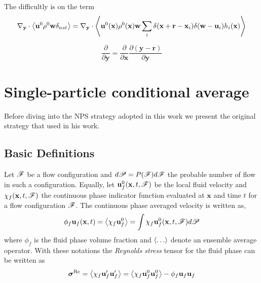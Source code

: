 The difficultly is on the term 
\begin{equation*}
    {\mathbf{\nabla}_\textbf{y}} \cdot \left<\textbf{u}^0\rho^0 \textbf{w}   \delta_{nst} \right>
    = 
    {\mathbf{\nabla}_\textbf{y}} \cdot \left<\textbf{u}^0(\textbf{x})\rho^0(\textbf{x}) \textbf{w}   \sum_i \delta(\textbf{x}+ \textbf{r} - \textbf{x}_i)\delta(\textbf{w}- \textbf{u}_i) h_i(\textbf{x}) \right>
\end{equation*}


\begin{equation*}
    \frac{\partial }{\partial \textbf{y}}
    = 
    \frac{\partial }{\partial \textbf{x}}
    \frac{\partial (\textbf{y} - \textbf{r} )}{\partial \textbf{y}}
\end{equation*}

\section{Single-particle conditional average}

Before diving into the NPS strategy adopted in this work we present the original strategy that \citet{van1982bubble} used in his work. 

\subsection{Basic Definitions}
Let $\mathscr{F}$ be a flow configuration and $d\mathscr{P} = P(\mathscr{F})d\mathscr{F}$ the probable number of flow in such a configuration. 
Equally, let $\textbf{u}_f^0(\textbf{x},t,\mathscr{F})$ be the local fluid velocity and $\chi_f(\textbf{x},t,\mathscr{F})$ the continuous phase indicator function evaluated at $\textbf{x}$ and time $t$ for a flow configuration $\mathscr{F}$. 
The continuous phase averaged velocity is written as, 
\begin{equation}
    \phi_f \textbf{u}_f(\textbf{x},t)
    = \left<\chi_f \textbf{u}_f^0\right> 
    = \int  \chi_f \textbf{u}_f^0(\textbf{x},t,\mathscr{F}) d\mathscr{P}
\end{equation}
where $\phi_f$ is the fluid phase volume fraction and $\left<\ldots\right>$ denote an ensemble average operator. 
With these notations the \textit{Reynolds stress} tensor for the fluid phase can be written as 
\begin{equation}
    \bm\sigma^\text{Re}
    =\left<\chi_f \textbf{u}_f'\textbf{u}_f'\right>
    =\left<\chi_f \textbf{u}_f^0 \textbf{u}_f^0 \right>
    - \phi_f \textbf{u}_f \textbf{u}_f
\end{equation}

